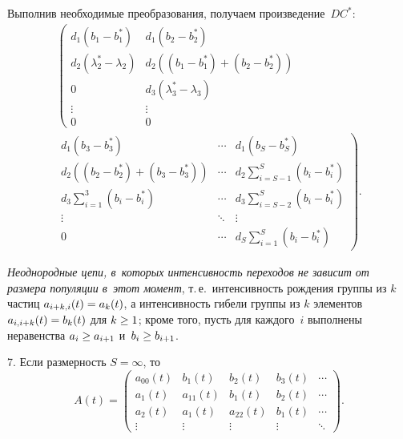 \begin{multicols}{2}
\noindent 
Выполнив необходимые преобразования, получаем произведение~$DC^*$:
\begin{multline*}
\left(
\begin{array}{cc}
d_1\left( b_1-b_1^*\right)                    & d_1\left( b_2-b_2^*\right)                  \\
d_2\left(\lambda_2^*-\lambda_2 \right)  &d_2((b_1-b_1^*)+(b_2 -b_2^*))   \\
0                                                  & d_3\left(\lambda_3^*-\lambda_3\right)       \\
\vdots                                             & \vdots                                           \\
0             & 0       
\end{array}
\right.\\[3pt]
\left.
\begin{array}{ccc}
 d_1\left( b_3-b_3^*\right)         & \cdots &d_1\left( b_{S}-b_{S}^*\right) \\
 d_2\left( \left( b_2-b_2^*\right)+\left( b_3-b_3^*\right)\right)  & \cdots &d_2 \displaystyle\sum\limits_{i=S-1}^{S} \left( b_{i} -  b_{i}^*\right) \\
 d_3 \displaystyle \sum\limits_{i=1}^{3} \left(b_{i} - b_{i}^*\right)    & \cdots & d_3\displaystyle\sum\limits_{i=S-2}^{S} \left( b_{i} -  b_{i}^*\right)\\
 \vdots                                  & \ddots                                 & \vdots \\
 0            & \cdots & d_S\displaystyle\sum\limits_{i=1}^{S}  \left(  b_{i} - b_{i}^*\right)
\end{array}
\right).
\end{multline*}


  \textit{Неоднородные цепи, в~которых интенсивность переходов 
не зависит от размера популяции в~этот момент}, т.\,е.\ интенсивность рождения 
группы из $k$ частиц $a_{i+k,i}(t)\hm=a_k(t)$, а
    интенсивность гибели группы из $k$ элементов  $a_{i,i+k}(t)\hm=b_k(t)$  для 
$k\hm\ge 1$;
  кроме того, пусть для каждого~$i$ выполнены неравенства $a_{i} \hm\geq a_{i+1}$ 
  и~$b_{i} \hm\geq b_{i+1}$.

7. Если размерность $S=\infty$, то
\begin{equation*}
A\left( t\right) = 
 \left(
\begin{array}{ccccc}
a_{00}(t)  & b_1(t)     & b_2(t)     & b_3(t)     &\cdots  \\
a_1(t)     & a_{11}(t)  & b_1(t)     & b_2(t)     &\cdots  \\
a_2(t)     & a_1(t)     & a_{22}(t)  & b_1(t)     & \cdots  \\
\vdots     & \vdots     & \vdots     & \vdots     & \ddots  
\end{array}
\right)\!.
\end{equation*}


\end{multicols}
